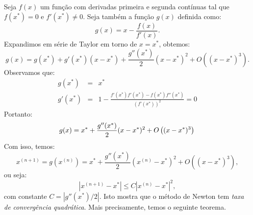 Seja $f(x)$ um função com derivadas primeira e segunda contínuas tal que $f(x^*)=0$ e $f'(x^*)\neq 0$. Seja também a função $g(x)$ definida como:
\begin{equation*}
  g(x)=x-\frac{f(x)}{f'(x)}.
\end{equation*}
Expandimos em série de Taylor em torno de $x = x^*$, obtemos:
\begin{equation*}
  g(x)=g(x^*)+g'(x^*)(x-x^*) + \frac{g''(x^*)}{2}(x-x^*)^2 + O\left((x-x^*)^3\right).
\end{equation*}
Observamos que:
\begin{eqnarray*}
g(x^*) &=& x^*\\
g'(x^*) &=& 1 - \frac{f'(x^*)f'(x^*)-f(x^*)f''(x^*)}{\left(f'(x^*)\right)^2} = 0
\end{eqnarray*}
Portanto:
\begin{equation*}
g(x) = x^* + \frac{g''(x^*)}{2}(x-x^*)^2 + O\left((x-x^*)^3\right)\\
\end{equation*}
Com isso, temos:
\begin{equation*}
x^{(n+1)} = g(x^{(n)}) =  x^*+ \frac{g''(x^*)}{2}(x^{(n)}-x^*)^2 + O\left((x-x^*)^3\right),
\end{equation*}
ou seja:
\begin{equation*}
\left|x^{(n+1)}-x^*\right| \leq C\left|x^{(n)}-x^*\right|^2,
\end{equation*}
com constante $C = \left|g''(x^*)/2\right|$. Isto mostra que o método de Newton tem \emph{taxa de convergência quadrática}. Mais precisamente, temos o seguinte teorema.

